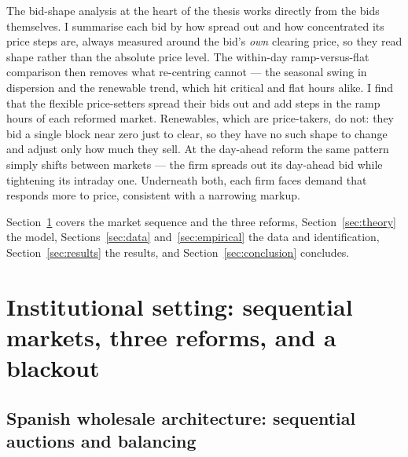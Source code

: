 \documentclass[11pt,a4paper]{article}
\theoremstyle{definition}
\theoremstyle{remark}
\theoremstyle{plain}
\begin{document}
The bid-shape analysis at the heart of the thesis works directly from the bids themselves. I summarise each bid by how spread out and how concentrated its price steps are, always measured around the bid's \emph{own} clearing price, so they read shape rather than the absolute price level. The within-day ramp-versus-flat comparison then removes what re-centring cannot --- the seasonal swing in dispersion and the renewable trend, which hit critical and flat hours alike. I find that the flexible price-setters spread their bids out and add steps in the ramp hours of each reformed market. Renewables, which are price-takers, do not: they bid a single block near zero just to clear, so they have no such shape to change and adjust only how much they sell. At the day-ahead reform the same pattern simply shifts between markets --- the firm spreads out its day-ahead bid while tightening its intraday one. Underneath both, each firm faces demand that responds more to price, consistent with a narrowing markup.

Section~\ref{sec:institutional} covers the market sequence and the three reforms, Section~\ref{sec:theory} the model, Sections~\ref{sec:data} and~\ref{sec:empirical} the data and identification, Section~\ref{sec:results} the results, and Section~\ref{sec:conclusion} concludes.



\section{Institutional setting: sequential markets, three reforms, and a blackout}\label{sec:institutional}

\subsection{Spanish wholesale architecture: sequential auctions and balancing}
\end{document}
